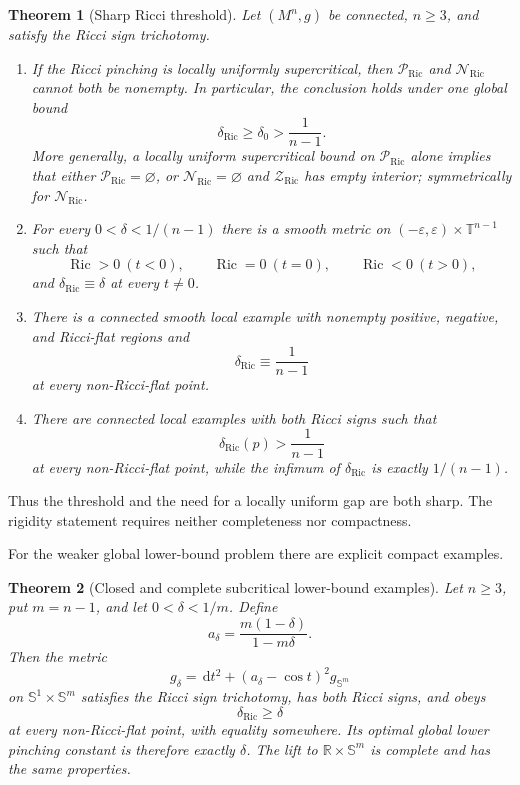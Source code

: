 \documentclass[11pt,reqno]{amsart}
\newtheorem{theorem}{Theorem}[section]
\theoremstyle{definition}
\theoremstyle{remark}
\newcommand{\Ric}{\operatorname{Ric}}
\newcommand{\dd}{\,\mathrm d}
\newcommand{\R}{\mathbb R}
\newcommand{\T}{\mathbb T}
\newcommand{\Sph}{\mathbb S}
\newcommand{\cP}{\mathcal P}
\newcommand{\cN}{\mathcal N}
\newcommand{\cZ}{\mathcal Z}
\newcommand{\dric}{\delta_{\mathrm{Ric}}}
\newcommand{\eps}{\varepsilon}
\begin{document}
\begin{theorem}[Sharp Ricci threshold]\label{thm:ricci-intro}
Let $(M^n,g)$ be connected, $n\ge3$, and satisfy the Ricci sign trichotomy.
\begin{enumerate}[label=(\alph*)]
\item If the Ricci pinching is locally uniformly supercritical, then $\cP_{\Ric}$ and $\cN_{\Ric}$ cannot both be nonempty.  In particular, the conclusion holds under one global bound
\[
\dric\ge\delta_0>\frac1{n-1}.
\]
More generally, a locally uniform supercritical bound on $\cP_{\Ric}$ alone implies that either $\cP_{\Ric}=\varnothing$, or $\cN_{\Ric}=\varnothing$ and $\cZ_{\Ric}$ has empty interior; symmetrically for $\cN_{\Ric}$.
\item For every $0<\delta<1/(n-1)$ there is a smooth metric on $(-\eps,\eps)\times\T^{n-1}$ such that
\[
\Ric>0\ (t<0),\qquad \Ric=0\ (t=0),\qquad \Ric<0\ (t>0),
\]
and $\dric\equiv\delta$ at every $t\ne0$.
\item There is a connected smooth local example with nonempty positive, negative, and Ricci-flat regions and
\[
\dric\equiv\frac1{n-1}
\]
at every non-Ricci-flat point.
\item There are connected local examples with both Ricci signs such that
\[
\dric(p)>\frac1{n-1}
\]
at every non-Ricci-flat point, while the infimum of $\dric$ is exactly $1/(n-1)$.
\end{enumerate}
\end{theorem}

Thus the threshold and the need for a locally uniform gap are both sharp.  The rigidity statement requires neither completeness nor compactness.

For the weaker global lower-bound problem there are explicit compact examples.

\begin{theorem}[Closed and complete subcritical lower-bound examples]\label{thm:global-intro}
Let $n\ge3$, put $m=n-1$, and let $0<\delta<1/m$.  Define
\begin{equation}\label{eq:a-delta-intro}
 a_\delta=\frac{m(1-\delta)}{1-m\delta}.
\end{equation}
Then the metric
\begin{equation}\label{eq:compact-family-intro}
 g_\delta=\dd t^2+(a_\delta-\cos t)^2g_{\Sph^m}
\end{equation}
on $\Sph^1\times\Sph^m$ satisfies the Ricci sign trichotomy, has both Ricci signs, and obeys
\[
\dric\ge\delta
\]
at every non-Ricci-flat point, with equality somewhere.  Its optimal global lower pinching constant is therefore exactly $\delta$.  The lift to $\R\times\Sph^m$ is complete and has the same properties.
\end{theorem}
\end{document}

